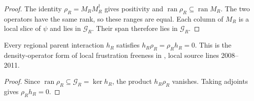 \begin{proof}\leanok
    The identity $\rho_R=M_RM_R^\dagger$ gives positivity and
    $\operatorname{ran}\rho_R\subseteq\operatorname{ran}M_R$.
    The two operators have the same rank, so these ranges are equal.
    Each column of $M_R$ is a local slice of $\psi$ and lies in
    $\mathcal G_R$. Their span therefore lies in $\mathcal G_R$.
\end{proof}

\begin{lemma}%
    \label{thm:peps_region_reduced_density_parent}
    \leanok
    Every regional parent interaction $h_R$ satisfies
    $h_R\rho_R=\rho_Rh_R=0$.
    This is the density-operator form of local frustration freeness
    in \cite[Section~IV.C.1]{Cirac2021Matrix}, local source lines
    2008--2011.
\end{lemma}

\begin{proof}\leanok
    Since $\operatorname{ran}\rho_R\subseteq\mathcal G_R=\ker h_R$,
    the product $h_R\rho_R$ vanishes. Taking adjoints gives
    $\rho_Rh_R=0$.
\end{proof}
